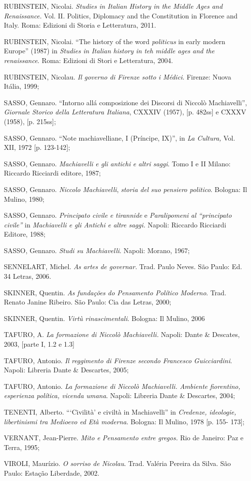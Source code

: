 RUBINSTEIN, Nicolai. \emph{Studies in Italian History in the Middle Ages
and Renaissance.} Vol. II. Politics, Diplomacy and the Constitution in
Florence and Italy. Roma: Edizioni di Storia e Letteratura, 2011.

RUBINSTEIN, Nicolai. ``The history of the word \emph{politicus} in early
modern Europe'' (1987) in \emph{Studies in Italian history in teh middle
ages and the renaissance}. Roma: Edizioni di Stori e Letteratura, 2004.

RUBINSTEIN, Nicolau. \emph{Il governo di Firenze sotto i Médici}.
Firenze: Nuova Itália, 1999;

SASSO, Gennaro. ``Intorno allá composizione dei Discorsi di Niccolò
Machiavelli'', \emph{Giornale Storico della Letteratura Italiana},
CXXXIV (1957), {[}p. 482ss{]} e CXXXV (1958), {[}p. 215ss{]};

SASSO, Gennaro. ``Note machiavelliane, I (Príncipe, IX)'', in \emph{La
Cultura,} Vol. XII, 1972 {[}p. 123-142{]};

SASSO, Gennaro. \emph{Machiavelli e gli antichi} \emph{e altri saggi}.
Tomo I e II Milano: Riccardo Ricciardi editore, 1987;

SASSO, Gennaro. \emph{Niccolo Machiavelli}, \emph{storia del suo
pensiero politico}. Bologna: Il Mulino, 1980;

SASSO, Gennaro. \emph{Principato civile e tirannide} e
\emph{Paralipomeni al ``principato civile''} in \emph{Machiavelli e gli
Antichi e altre saggi.} Napoli: Riccardo Ricciardi Editore, 1988;

SASSO, Gennaro. \emph{Studi su Machiavelli}. Napoli: Morano, 1967;

SENNELART, Michel. \emph{As artes de governar.} Trad. Paulo Neves. São
Paulo: Ed. 34 Letras, 2006.

SKINNER, Quentin. \emph{As fundações do Pensamento Político Moderno}.
Trad. Renato Janine Ribeiro. São Paulo: Cia das Letras, 2000;

SKINNER, Quentin. \emph{Virtù rinascimentali}. Bologna: Il Mulino, 2006

TAFURO, A. \emph{La formazione di Niccolò Machiavelli.} Napoli: Dante \&
Descates, 2003, {[}parte I, 1.2 e 1.3{]}

TAFURO, Antonio. \emph{Il reggimento di Firenze secondo Francesco
Guicciardini}. Napoli: Libreria Dante \& Descartes, 2005;

TAFURO, Antonio. \emph{La formazione di Niccolò Machiavelli. Ambiente
fiorentino, esperienza política, vicenda umana}. Napoli: Libreria Dante
\& Descartes, 2004;

TENENTI, Alberto. ```Civilità' e civiltà in Machiavelli'' in
\emph{Credenze, ideologie, libertinismi tra Medioevo ed Età moderna}.
Bologna: Il Mulino, 1978 {[}p. 155- 173{]};

VERNANT, Jean-Pierre. \emph{Mito e Pensamento entre gregos.} Rio de
Janeiro: Paz e Terra, 1995;

VIROLI, Maurízio. \emph{O sorriso de Nicolau}. Trad. Valéria Pereira da
Silva. São Paulo: Estação Liberdade, 2002.
